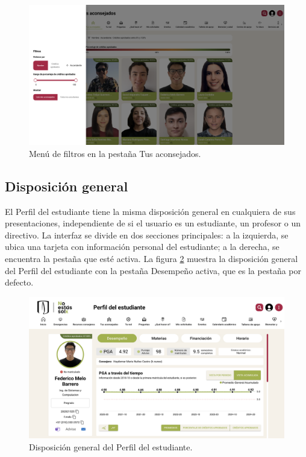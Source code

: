 \begin{figure}[H]
	\includegraphics[width=\textwidth]{assets/nes/filtros.png}
	\caption{Menú de filtros en la pestaña Tus aconsejados.}
	\label{fig:filtros}
\end{figure}

\subsection{Disposición general}

El Perfil del estudiante tiene la misma disposición general en cualquiera de sus presentaciones, independiente de si el usuario es un estudiante, un profesor o un directivo. La interfaz se divide en dos secciones principales: a la izquierda, se ubica una tarjeta con información personal del estudiante; a la derecha, se encuentra la pestaña que esté activa. La figura \ref{fig:perfil} muestra la disposición general del Perfil del estudiante con la pestaña Desempeño activa, que es la pestaña por defecto.

\begin{figure}[H]
	\includegraphics[width=\textwidth]{assets/nes/perfil.png}
	\caption{Disposición general del Perfil del estudiante.}
	\label{fig:perfil}
\end{figure}

